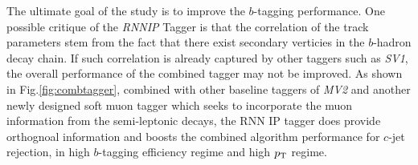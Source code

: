 \label{sec:rnn-result-combination}
The ultimate goal of the study is to improve the $b$-tagging performance. One possible critique of the \textit{RNNIP} Tagger is that the correlation of the track parameters stem from the fact that there exist secondary verticies in the $b$-hadron decay chain. If such correlation is already captured by other taggers such as \textit{SV1}, the overall performance of the combined tagger may not be improved. As shown in Fig.\ref{fig:combtagger}, combined with other baseline taggers of \textit{MV2} and another newly designed soft muon tagger which seeks to incorporate the muon information from the semi-leptonic decays, the RNN IP tagger does provide orthognoal information and boosts the combined algorithm performance for $c$-jet rejection, in high $b$-tagging efficiency regime and high $p_{{\rm T}}$ regime. 


